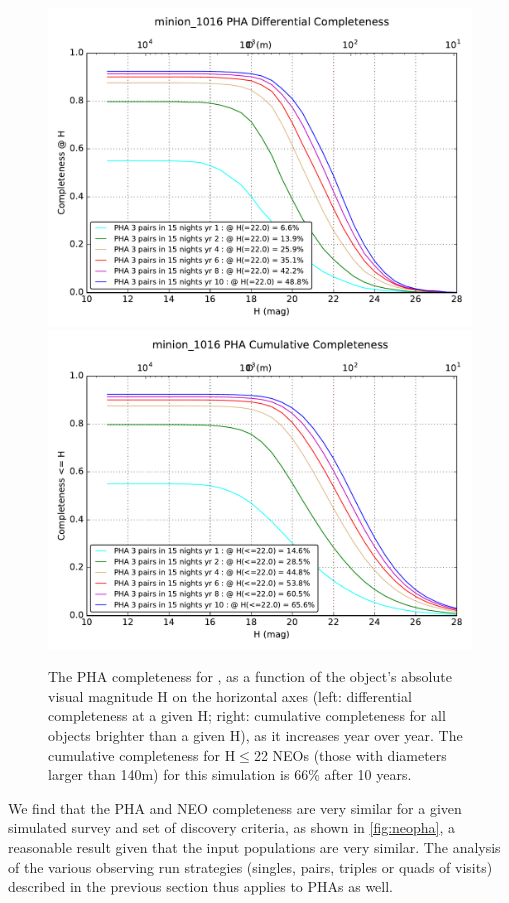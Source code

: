 \begin{figure}[th]
\includegraphics[angle=0,width=0.49\hsize:,clip]{figs/solarsystem/minion_1016_DifferentialCompleteness_PHA_3_pairs_in_15_nights_Years_1_to_10_MOOB_ComboMetricVsH.pdf}
\includegraphics[angle=0,width=0.49\hsize:,clip]{figs/solarsystem/minion_1016_CumulativeCompleteness_PHA_ComboMetricVsH.pdf}
\caption{The PHA completeness for , as a function of the object's absolute
visual magnitude H on the horizontal axes (left: differential completeness at a given H;
right: cumulative completeness for all objects brighter than a given H), as it increases year over year.
The cumulative completeness for H$\le$22 NEOs (those with diameters larger than 140m)  for this
simulation is 66\% after 10 years.}
\label{fig:baselinePHA}
\end{figure}

We find that the PHA and NEO completeness are very similar for a given simulated survey and set of discovery criteria, as shown in \autoref{fig:neopha},
a reasonable result given that the input populations are very similar.
The analysis of the various observing run strategies (singles, pairs, triples or quads of visits) described in the previous section thus applies to PHAs as well.

